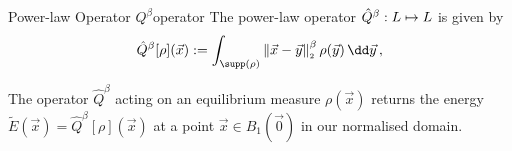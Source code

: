 \begin{definition}{Power-law Operator $Q^\beta$}{operator}
  The power-law operator $\hat{Q}^\beta: L \mapsto L$ is given by
  $$\hat{Q}^\beta[\rho](\vec{x}) := \int_{\supp(\rho)} \norm{\vec{x}-\vec{y}}^\beta \rho(\vec{y}) \,\dd\vec{y}\,,$$
\end{definition}

The operator $\hat{Q}^\beta$ acting on an equilibrium measure $\rho(\vec{x})$ returns the energy $\tilde{E}(\vec{x}) = \hat{Q}^\beta[\rho](\vec{x})$ at a point $\vec{x} \in B_1(\vec{0})$ in our normalised domain.

